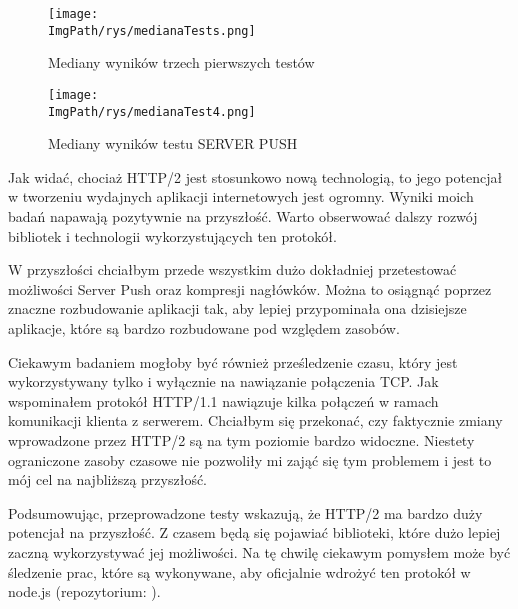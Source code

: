 \documentclass[a4paper,12pt,twoside,openany]{report}
\newcommand{\ImgPath}{.}
\begin{document}
\begin{figure}[!htbp]
	\begin{center}
\centering
\texttt{[image: \\ImgPath/rys/medianaTests.png]}
\end{center}
	\caption{Mediany wyników trzech pierwszych testów}
	\label{schematMedianaTests}
\end{figure}

\begin{figure}[!htbp]
	\begin{center}
\centering
\texttt{[image: \\ImgPath/rys/medianaTest4.png]}
\end{center}
	\caption{Mediany wyników testu SERVER PUSH}
	\label{schematMedianaTest4}
\end{figure}

Jak widać, chociaż HTTP/2 jest stosunkowo nową technologią, to jego potencjał w tworzeniu wydajnych aplikacji internetowych jest ogromny. Wyniki moich badań napawają pozytywnie na przyszłość. Warto obserwować dalszy rozwój bibliotek i technologii wykorzystujących ten protokół.

W przyszłości chciałbym przede wszystkim dużo dokładniej przetestować możliwości Server Push oraz kompresji nagłówków. Można to osiągnąć poprzez znaczne rozbudowanie aplikacji tak, aby lepiej przypominała ona dzisiejsze aplikacje, które są bardzo rozbudowane pod względem zasobów.

Ciekawym badaniem mogłoby być również prześledzenie czasu, który jest wykorzystywany tylko i wyłącznie na nawiązanie połączenia TCP.
Jak wspominałem protokół HTTP/1.1 nawiązuje kilka połączeń w ramach komunikacji klienta z serwerem.
Chciałbym się przekonać, czy faktycznie zmiany wprowadzone przez HTTP/2 są na tym poziomie bardzo widoczne.
Niestety ograniczone zasoby czasowe nie pozwoliły mi zająć się tym problemem i jest to mój cel na najbliższą przyszłość.

Podsumowując, przeprowadzone testy wskazują, że HTTP/2 ma bardzo duży potencjał na przyszłość.
Z czasem będą się pojawiać biblioteki, które dużo lepiej zaczną wykorzystywać jej możliwości. Na tę chwilę ciekawym pomysłem może być śledzenie prac, które są wykonywane, aby oficjalnie wdrożyć ten protokół w node.js (repozytorium: \cite{nodeHttp2Impl}).

\end{document}
